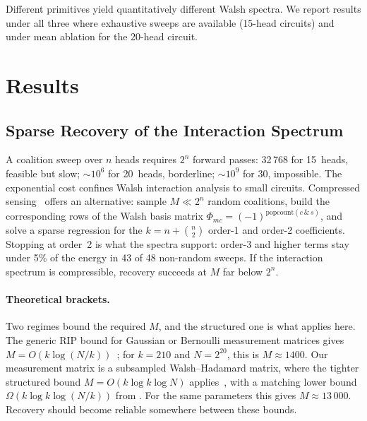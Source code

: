 \documentclass{article}
\begin{document}
Different primitives yield quantitatively different Walsh spectra. We
report results under all three where exhaustive sweeps are available
(15-head circuits) and under mean ablation for the 20-head circuit.



\section{Results}
\label{sec:results}


%
%

\subsection{Sparse Recovery of the Interaction Spectrum}
\label{sec:sparse-walsh-recovery}

A coalition sweep over $n$ heads requires $2^n$ forward passes: 32\,768
for 15~heads, feasible but slow; ${\sim}10^6$ for 20~heads, borderline;
${\sim}10^9$ for 30, impossible. The exponential cost confines Walsh
interaction analysis to small circuits.  Compressed
sensing~\citep{candes2005decoding} offers an alternative: sample $M \ll 2^n$
random coalitions, build the corresponding rows of the Walsh basis matrix
$\Phi_{mc} = (-1)^{\mathrm{popcount}(c \,\&\, s)}$, and solve a sparse regression for the $k = n + \binom{n}{2}$ order-1 and order-2 coefficients. Stopping at order~2 is what the spectra support: order-3 and higher terms stay under 5\% of the energy in 43 of 48 non-random sweeps.
If the interaction spectrum is compressible, recovery succeeds at $M$
far below $2^n$.

\paragraph{Theoretical brackets.}

Two regimes bound the required $M$, and the structured one is what applies here. The generic RIP bound for Gaussian or Bernoulli measurement matrices gives
$M = O(k \log(N/k))$~\citep{candes2005decoding}; for $k=210$ and
$N = 2^{20}$, this is $M \approx 1400$. Our measurement matrix is a
subsampled Walsh--Hadamard matrix, where the tighter structured bound
$M = O(k \log k \log N)$ applies~\citep{bourgain2014,rudelson2008sparse},
with a matching lower bound $\Omega(k \log k \log(N/k))$ from
\citet{blasiok2019sparse}. For the same parameters this gives $M \approx 13\,000$.
Recovery should become reliable somewhere between these bounds.
\end{document}
